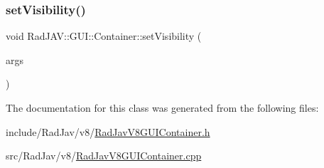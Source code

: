 \mbox{\label{class_rad_j_a_v_1_1_g_u_i_1_1_container_af95aceb6b787117b65e2bb94d75eb206}} 
\subsubsection{\texorpdfstring{set\+Visibility()}{setVisibility()}}
{\footnotesize\ttfamily void Rad\+J\+A\+V\+::\+G\+U\+I\+::\+Container\+::set\+Visibility (\begin{DoxyParamCaption}\item[{const v8\+::\+Function\+Callback\+Info$<$ v8\+::\+Value $>$ \&}]{args }\end{DoxyParamCaption})\hspace{0.3cm}{\ttfamily [static]}}



The documentation for this class was generated from the following files\+:\begin{DoxyCompactItemize}
\item 
include/\+Rad\+Jav/v8/\mbox{\hyperlink{_rad_jav_v8_g_u_i_container_8h}{Rad\+Jav\+V8\+G\+U\+I\+Container.\+h}}\item 
src/\+Rad\+Jav/v8/\mbox{\hyperlink{_rad_jav_v8_g_u_i_container_8cpp}{Rad\+Jav\+V8\+G\+U\+I\+Container.\+cpp}}\end{DoxyCompactItemize}
